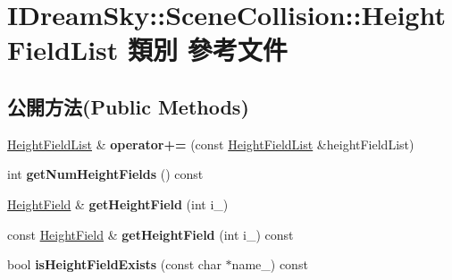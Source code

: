 \hypertarget{class_i_dream_sky_1_1_scene_collision_1_1_height_field_list}{}\section{I\+Dream\+Sky\+:\+:Scene\+Collision\+:\+:Height\+Field\+List 類別 參考文件}
\label{class_i_dream_sky_1_1_scene_collision_1_1_height_field_list}
\subsection*{公開方法(Public Methods)}
\begin{DoxyCompactItemize}
\item 
\hyperlink{class_i_dream_sky_1_1_scene_collision_1_1_height_field_list}{Height\+Field\+List} \& {\bfseries operator+=} (const \hyperlink{class_i_dream_sky_1_1_scene_collision_1_1_height_field_list}{Height\+Field\+List} \&height\+Field\+List)\hypertarget{class_i_dream_sky_1_1_scene_collision_1_1_height_field_list_a6849b3ae1cf96237d24c429f394fa750}{}\label{class_i_dream_sky_1_1_scene_collision_1_1_height_field_list_a6849b3ae1cf96237d24c429f394fa750}

\item 
int {\bfseries get\+Num\+Height\+Fields} () const \hypertarget{class_i_dream_sky_1_1_scene_collision_1_1_height_field_list_a587b78afe8dd856e8c888aa239b64c82}{}\label{class_i_dream_sky_1_1_scene_collision_1_1_height_field_list_a587b78afe8dd856e8c888aa239b64c82}

\item 
\hyperlink{class_i_dream_sky_1_1_scene_collision_1_1_height_field}{Height\+Field} \& {\bfseries get\+Height\+Field} (int i\+\_\+)\hypertarget{class_i_dream_sky_1_1_scene_collision_1_1_height_field_list_a83f65a0c1a232158998e90ae8078b3ab}{}\label{class_i_dream_sky_1_1_scene_collision_1_1_height_field_list_a83f65a0c1a232158998e90ae8078b3ab}

\item 
const \hyperlink{class_i_dream_sky_1_1_scene_collision_1_1_height_field}{Height\+Field} \& {\bfseries get\+Height\+Field} (int i\+\_\+) const \hypertarget{class_i_dream_sky_1_1_scene_collision_1_1_height_field_list_a05087f9a496498e517f835c2e3a1a495}{}\label{class_i_dream_sky_1_1_scene_collision_1_1_height_field_list_a05087f9a496498e517f835c2e3a1a495}

\item 
bool {\bfseries is\+Height\+Field\+Exists} (const char $\ast$name\+\_\+) const \hypertarget{class_i_dream_sky_1_1_scene_collision_1_1_height_field_list_a9d11e984b2daa9a5bff5da75456de475}{}\label{class_i_dream_sky_1_1_scene_collision_1_1_height_field_list_a9d11e984b2daa9a5bff5da75456de475}


\end{DoxyCompactItemize}

